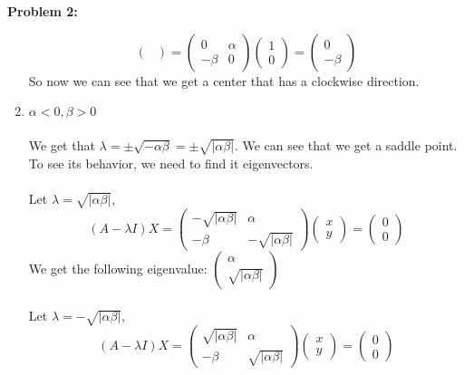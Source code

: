 \documentclass[11pt]{article}
\newenvironment{problem}[1]{\textbf{Problem #1: }}{\newpage}
\begin{document}
\begin{problem}{2}
\begin{enumerate}[label = (\roman*)]
\[\begin{pmatrix}
			\end{pmatrix} = \begin{pmatrix}
				0 & \alpha \\
				-\beta & 0 
			\end{pmatrix}\begin{pmatrix}
				1 \\ 0
			\end{pmatrix} = \begin{pmatrix}
				0 \\ -\beta 
			\end{pmatrix}\]
			So now we can see that we get a center that has a clockwise direction.
			\item \boldmath $\alpha < 0, \beta > 0$ \unboldmath 
			\\ \\
			We get that $\lambda = \pm \sqrt{- \alpha \beta} = \pm \sqrt{|\alpha\beta|}$.  We can see that we get a saddle point. To see its behavior, we need to find it eigenvectors.
			\\ \\
			Let $\lambda = \sqrt{|\alpha\beta|}$,
			\[
			(A - \lambda I)X = 
			\begin{pmatrix}
				-\sqrt{|\alpha\beta|} & \alpha \\
				-\beta & -\sqrt{|\alpha\beta|} 
			\end{pmatrix} 
			\begin{pmatrix}
				x \\ y
			\end{pmatrix} = 
			\begin{pmatrix}
				0 \\ 0
			\end{pmatrix}
			\]
			We get the following eigenvalue: $\begin{pmatrix}
				\alpha \\ \sqrt{|\alpha\beta|}
			\end{pmatrix}$
			\\ \\
			Let $\lambda = -\sqrt{|\alpha\beta|}$,
			\[
			(A - \lambda I)X = 
			\begin{pmatrix}
			\sqrt{|\alpha\beta|} & \alpha \\
			-\beta & \sqrt{|\alpha\beta|} 
			\end{pmatrix} 
			\begin{pmatrix}
			x \\ y
			\end{pmatrix} = 
			\begin{pmatrix}
			0 \\ 0

\end{pmatrix}\]
\end{enumerate}
\end{problem}
\end{document}
